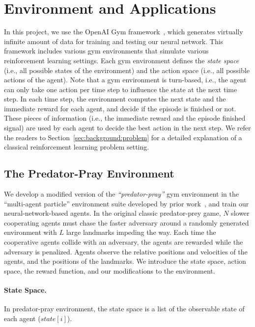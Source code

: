 
\section{Environment and Applications}
\label{sec:application}

In this project, we use the OpenAI Gym framework~\cite{gym.openai16}, which
generates virtually infinite amount of data for training and testing our
neural network. This framework includes various gym environments that simulate
various reinforcement learning settings. Each gym environment defines the
\emph{state space} (i.e., all possible states of the environment) and the
action space (i.e., all possible actions of the agent). Note that a gym
environment is turn-based, i.e., the agent can only take one action per time
step to influence the state at the next time step. In each time step, the
environment computes the next state and the immediate reward for each agent,
and decide if the episode is finished or not. These pieces of information
(i.e., the immediate reward and the episode finished signal) are used by each
agent to decide the best action in the next step. We refer the readers to
Section~\ref{sec:background:problem} for a detailed explanation of a classical
reinforcement learning problem setting.

\subsection{The Predator-Pray Environment}

We develop a modified version of the \emph{``predator-pray''} gym environment
in the ``multi-agent particle'' environment suite developed by prior
work~\cite{lowe2017multi, mordatch2017emergence}, and train our
neural-network-based agents. In the original classic predator-prey game, $N$
slower cooperating agents must chase the faster adversary around a randomly
generated environment with $L$ large landmarks impeding the way. Each time the
cooperative agents collide with an adversary, the agents are rewarded while
the adversary is penalized. Agents observe the relative positions and
velocities of the agents, and the positions of the landmarks. We introduce the
state space, action space, the reward function, and our modifications to the
environment.

\paragraph{State Space.} In predator-pray environment, the state space is a
list of the observable state of each agent ($state[i]$).



